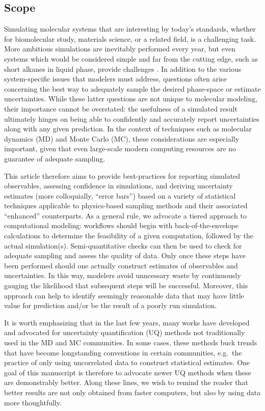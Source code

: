 \subsection{Scope}

Simulating molecular systems that are interesting by today's standards, whether for biomolecular study, materials science, or a related field, is a challenging task.
More ambitious simulations are inevitably performed every year, but even systems which would be considered simple and far from the cutting edge, such as short alkanes in liquid phase, provide challenges \cite{Schappals2017}.
In addition to the various system-specific issues that modelers must address, questions often arise concerning the best way to adequately sample the desired phase-space or estimate uncertainties.  While these latter questions are not unique to molecular modeling, their importance cannot be overstated: the usefulness of a simulated result ultimately hinges on being able to confidently and accurately report uncertainties along with any given prediction.  In the context of techniques such as molecular dynamics (MD) and Monte Carlo (MC), these considerations are especially important, given that even large-scale modern computing resources are no guarantee of adequate sampling.

This article therefore aims to provide best-practices for reporting simulated observables, assessing confidence in simulations, and deriving uncertainty estimates (more colloquially, ``error bars'') based on a variety of statistical techniques applicable to physics-based sampling methods and their associated ``enhanced'' counterparts.  As a general rule, we advocate a tiered approach to computational modeling: workflows should begin with back-of-the-envelope calculations to determine the feasibility of a given computation, followed by the actual simulation(s).  Semi-quantitative checks can then be used to check for adequate sampling and assess the quality of data.  Only once these steps have been performed should one actually construct estimates of observables and uncertainties.  In this way, modelers avoid unncessary waste by continuously gauging the likelihood that subsequent steps will be successful.  Moreover, this approach can help to identify seemingly reasonable data that may have little value for prediction and/or be the result of a poorly run simulation.

It is worth emphasizing that in the last few years, many works have developed and advocated for uncertainty quantification (UQ) methods not traditionally used in the MD and MC communities.  In some cases, these methods buck trends that have become longstanding conventions in certain communities, e.g.\ the practice of only using uncorrelated data to construct statistical estimates.  One goal of this manuscript is therefore to advocate newer UQ methods when these are demonstrably better.  Along these lines, we wish to remind the reader that better results are not only obtained from faster computers, but also by using data more thoughtfully.  

